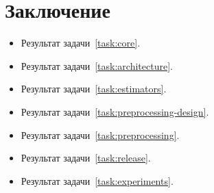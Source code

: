 
\section*{Заключение}

\begin{itemize}
    \item Результат задачи~\ref{task:core}.
    \item Результат задачи~\ref{task:architecture}.
    \item Результат задачи~\ref{task:estimators}.
    \item Результат задачи~\ref{task:preprocessing-design}.
    \item Результат задачи~\ref{task:preprocessing}.
    \item Результат задачи~\ref{task:release}.
    \item Результат задачи~\ref{task:experiments}.
\end{itemize}

